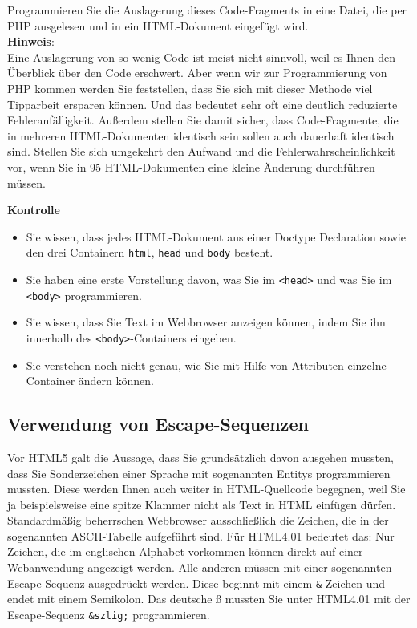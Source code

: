 Programmieren Sie die Auslagerung dieses Code-Fragments in eine Datei, die per PHP ausgelesen und in ein HTML-Dokument eingefügt wird.\\

\textbf{Hinweis}:\\

Eine Auslagerung von so wenig Code ist meist nicht sinnvoll, weil es Ihnen den Überblick über den Code erschwert. Aber wenn wir zur Programmierung von PHP kommen werden Sie feststellen, dass Sie sich mit dieser Methode viel Tipparbeit ersparen können. Und das bedeutet sehr oft eine deutlich reduzierte Fehleranfälligkeit. Außerdem stellen Sie damit sicher, dass Code-Fragmente, die in mehreren HTML-Dokumenten identisch sein sollen auch dauerhaft identisch sind. Stellen Sie sich umgekehrt den Aufwand und die Fehlerwahrscheinlichkeit vor, wenn Sie in 95 HTML-Dokumenten eine kleine Änderung durchführen müssen.

\textbf{Kontrolle}

\begin{itemize}
	\item Sie wissen, dass jedes HTML-Dokument aus einer Doctype Declaration sowie den drei Containern \verb|html|, \verb|head| und \verb|body| besteht.
	\item Sie haben eine erste Vorstellung davon, was Sie im \verb|<head>| und was Sie im \verb|<body>| programmieren.
	\item Sie wissen, dass Sie Text im Webbrowser anzeigen können, indem Sie ihn innerhalb des \verb|<body>|-Containers eingeben.
	\item Sie verstehen noch nicht genau, wie Sie mit Hilfe von Attributen einzelne Container ändern können.
\end{itemize}

\subsection{Verwendung von Escape-Sequenzen}

Vor HTML5 galt die Aussage, dass Sie grundsätzlich davon ausgehen mussten, dass Sie Sonderzeichen einer Sprache mit sogenannten Entitys programmieren mussten. Diese werden Ihnen auch weiter in HTML-Quellcode begegnen, weil Sie ja beispielsweise eine spitze Klammer nicht als Text in HTML einfügen dürfen.\\

Standardmäßig beherrschen Webbrowser ausschließlich die Zeichen, die in der sogenannten ASCII-Tabelle aufgeführt sind. Für HTML4.01 bedeutet das: Nur Zeichen, die im englischen Alphabet vorkommen können direkt auf einer Webanwendung angezeigt werden. Alle anderen müssen mit einer sogenannten Escape-Sequenz ausgedrückt werden. Diese beginnt mit einem \verb|&|-Zeichen und endet mit einem Semikolon. Das deutsche ß mussten Sie unter HTML4.01 mit der Escape-Sequenz \verb|&szlig;| programmieren.\\

